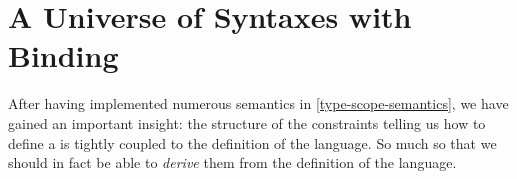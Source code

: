 \chapter{A Universe of Syntaxes with Binding}

After having implemented numerous semantics in \cref{type-scope-semantics},
we have gained an important insight: the structure of the constraints telling
us how to define a  is tightly coupled to the definition of the
language. So much so that we should in fact be able to \emph{derive} them
from the definition of the language.
